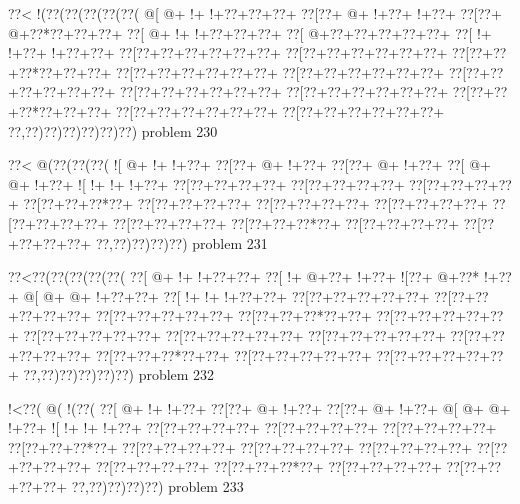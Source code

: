 \vbox{\vbox{\goo
\0??<\- !(\0??(\0??(\0??(\0??(\0??(
\- @[\- @+\- !+\- !+\0??+\0??+\0??+
\0??[\0??+\- @+\- !+\0??+\- !+\0??+
\0??[\0??+\- @+\0??*\0??+\0??+\0??+
\0??[\- @+\- !+\- !+\0??+\0??+\0??+
\0??[\- @+\0??+\0??+\0??+\0??+\0??+
\0??[\- !+\- !+\0??+\- !+\0??+\0??+
\0??[\0??+\0??+\0??+\0??+\0??+\0??+
\0??[\0??+\0??+\0??+\0??+\0??+\0??+
\0??[\0??+\0??+\0??*\0??+\0??+\0??+
\0??[\0??+\0??+\0??+\0??+\0??+\0??+
\0??[\0??+\0??+\0??+\0??+\0??+\0??+
\0??[\0??+\0??+\0??+\0??+\0??+\0??+
\0??[\0??+\0??+\0??+\0??+\0??+\0??+
\0??[\0??+\0??+\0??+\0??+\0??+\0??+
\0??[\0??+\0??+\0??*\0??+\0??+\0??+
\0??[\0??+\0??+\0??+\0??+\0??+\0??+
\0??[\0??+\0??+\0??+\0??+\0??+\0??+
\0??,\0??)\0??)\0??)\0??)\0??)\0??)
}
\hfil problem 230\hfil\break
}

\vbox{\vbox{\goo
\0??<\- @(\0??(\0??(\0??(
\- ![\- @+\- !+\- !+\0??+
\0??[\0??+\- @+\- !+\0??+
\0??[\0??+\- @+\- !+\0??+
\0??[\- @+\- @+\- !+\0??+
\- ![\- !+\- !+\- !+\0??+
\0??[\0??+\0??+\0??+\0??+
\0??[\0??+\0??+\0??+\0??+
\0??[\0??+\0??+\0??+\0??+
\0??[\0??+\0??+\0??*\0??+
\0??[\0??+\0??+\0??+\0??+
\0??[\0??+\0??+\0??+\0??+
\0??[\0??+\0??+\0??+\0??+
\0??[\0??+\0??+\0??+\0??+
\0??[\0??+\0??+\0??+\0??+
\0??[\0??+\0??+\0??*\0??+
\0??[\0??+\0??+\0??+\0??+
\0??[\0??+\0??+\0??+\0??+
\0??,\0??)\0??)\0??)\0??)
}
\hfil problem 231\hfil\break
}

\vbox{\vbox{\goo
\0??<\0??(\0??(\0??(\0??(\0??(
\0??[\- @+\- !+\- !+\0??+\0??+
\0??[\- !+\- @+\0??+\- !+\0??+
\- ![\0??+\- @+\0??*\- !+\0??+
\- @[\- @+\- @+\- !+\0??+\0??+
\0??[\- !+\- !+\- !+\0??+\0??+
\0??[\0??+\0??+\0??+\0??+\0??+
\0??[\0??+\0??+\0??+\0??+\0??+
\0??[\0??+\0??+\0??+\0??+\0??+
\0??[\0??+\0??+\0??*\0??+\0??+
\0??[\0??+\0??+\0??+\0??+\0??+
\0??[\0??+\0??+\0??+\0??+\0??+
\0??[\0??+\0??+\0??+\0??+\0??+
\0??[\0??+\0??+\0??+\0??+\0??+
\0??[\0??+\0??+\0??+\0??+\0??+
\0??[\0??+\0??+\0??*\0??+\0??+
\0??[\0??+\0??+\0??+\0??+\0??+
\0??[\0??+\0??+\0??+\0??+\0??+
\0??,\0??)\0??)\0??)\0??)\0??)
}
\hfil problem 232\hfil\break
}

\vbox{\vbox{\goo
\- !<\0??(\- @(\- !(\0??(
\0??[\- @+\- !+\- !+\0??+
\0??[\0??+\- @+\- !+\0??+
\0??[\0??+\- @+\- !+\0??+
\- @[\- @+\- @+\- !+\0??+
\- ![\- !+\- !+\- !+\0??+
\0??[\0??+\0??+\0??+\0??+
\0??[\0??+\0??+\0??+\0??+
\0??[\0??+\0??+\0??+\0??+
\0??[\0??+\0??+\0??*\0??+
\0??[\0??+\0??+\0??+\0??+
\0??[\0??+\0??+\0??+\0??+
\0??[\0??+\0??+\0??+\0??+
\0??[\0??+\0??+\0??+\0??+
\0??[\0??+\0??+\0??+\0??+
\0??[\0??+\0??+\0??*\0??+
\0??[\0??+\0??+\0??+\0??+
\0??[\0??+\0??+\0??+\0??+
\0??,\0??)\0??)\0??)\0??)
}
\hfil problem 233\hfil\break
}

